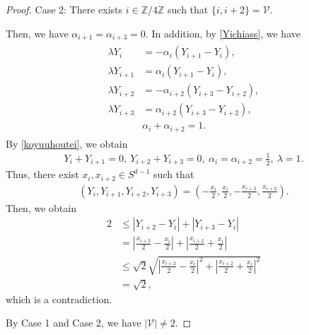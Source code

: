 \documentclass[10pt,a4paper]{amsart}
\numberwithin{equation}{section}
\begin{document}
\begin{proof}
Case 2: There exists $i\in\mathbb{Z}/4\mathbb{Z}$ such that $\{i,i+2\}=\mathcal{V}$.



Then, we have $\alpha_{i+1}=\alpha_{i+3}=0$. In addition, by \eqref{Yichiass}, we have
\begin{align}\label{koyuuhoutei}
\begin{aligned}
\lambda Y_i&=-\alpha_i\left(Y_{i+1}-Y_i\right),
\\
\lambda Y_{i+1}&=\alpha_i\left(Y_{i+1}-Y_i\right),
\\
\lambda Y_{i+2}&=-\alpha_{i+2}\left(Y_{i+3}-Y_{i+2}\right),
\\
\lambda Y_{i+3}&=\alpha_{i+2}\left(Y_{i+3}-Y_{i+2}\right),
\\
&\alpha_i+\alpha_{i+2}=1.
\end{aligned}
\end{align}
By \eqref{koyuuhoutei}, we obtain
\begin{align*}
Y_i+Y_{i+1}=0,\ Y_{i+2}+Y_{i+3}=0,\ \alpha_i=\alpha_{i+2}=\frac{1}{2},\ \lambda=1.
\end{align*}
Thus, there exist $x_i,x_{i+2}\in S^{d-1}$ such that 
\begin{align*}
\left(Y_i,Y_{i+1},Y_{i+2},Y_{i+3}\right)=\left(-\frac{x_i}{2},\frac{x_i}{2},-\frac{x_{i+2}}{2},\frac{x_{i+2}}{2}\right).
\end{align*}
Then, we obtain
\begin{align*}
2&\leq \left|Y_{i+2}-Y_i\right|+\left|Y_{i+3}-Y_i\right|
\\
&=\left|\frac{x_{i+2}}{2}-\frac{x_i}{2}\right|+\left|\frac{x_{i+2}}{2}+\frac{x_i}{2}\right|
\\
&\leq \sqrt{2}\sqrt{\left|\frac{x_{i+2}}{2}-\frac{x_i}{2}\right|^2+\left|\frac{x_{i+2}}{2}+\frac{x_i}{2}\right|^2}
\\
&=\sqrt{2},
\end{align*}
which is a contradiction. 

By Case 1 and Case 2, we have $|\mathcal{V}|\neq 2$.


\end{proof}
\end{document}
